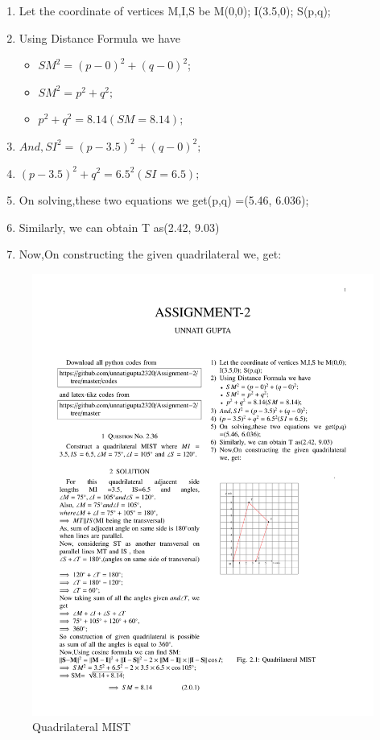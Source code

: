 \documentclass[journal,12pt,twocolumn]{IEEEtran}
\begin{document}
\begin{enumerate}
    \item Let the coordinate of vertices M,I,S be M(0,0); I(3.5,0); S(p,q);
    \item Using Distance Formula we have 
    \begin{itemize}
    \item ${SM^2}={(p-0)^2+(q-0)^2}$;
    \item $SM^2=p^2+q^2;$
    \item $p^2+q^2=8.14(SM=8.14);$
    \end{itemize}
    \item $And, SI^2=(p-3.5)^2+(q-0)^2;$
    \item $(p-3.5)^2+q^2 =6.5^2(SI=6.5);$
    \item On solving,these two equations we get(p,q) =(5.46, 6.036);
    \item Similarly, we can obtain  T as(2.42, 9.03)
    \item Now,On constructing the given  quadrilateral we, get:
\end{enumerate}
\begin{figure}[!ht]
\centering
\includegraphics[width=\columnwidth]{Assignment2.pdf}
\caption{Quadrilateral MIST}
\label{fig:Quadrilateral MIST}	
\end{figure}
\end{document}
